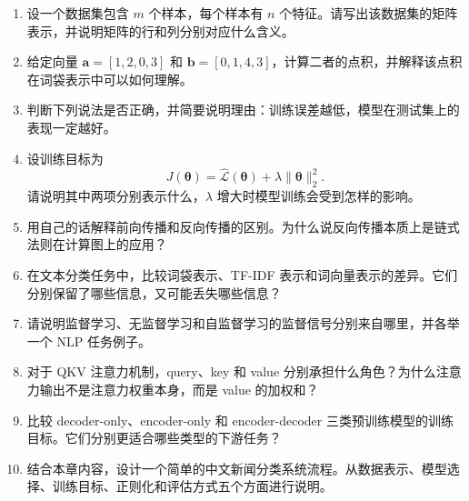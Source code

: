 \begin{exercisebox}
  \begin{enumerate}
    \item 设一个数据集包含 $m$ 个样本，每个样本有 $n$ 个特征。请写出该数据集的矩阵表示，并说明矩阵的行和列分别对应什么含义。

    \item 给定向量 $\mathbf{a}=[1,2,0,3]$ 和 $\mathbf{b}=[0,1,4,3]$，计算二者的点积，并解释该点积在词袋表示中可以如何理解。

    \item 判断下列说法是否正确，并简要说明理由：训练误差越低，模型在测试集上的表现一定越好。

    \item 设训练目标为
    \[
      J(\boldsymbol{\theta})=\hat{\mathcal{L}}(\boldsymbol{\theta})+\lambda\|\boldsymbol{\theta}\|_2^2.
    \]
    请说明其中两项分别表示什么，$\lambda$ 增大时模型训练会受到怎样的影响。

    \item 用自己的话解释前向传播和反向传播的区别。为什么说反向传播本质上是链式法则在计算图上的应用？

    \item 在文本分类任务中，比较词袋表示、TF-IDF 表示和词向量表示的差异。它们分别保留了哪些信息，又可能丢失哪些信息？

    \item 请说明监督学习、无监督学习和自监督学习的监督信号分别来自哪里，并各举一个 NLP 任务例子。

    \item 对于 QKV 注意力机制，query、key 和 value 分别承担什么角色？为什么注意力输出不是注意力权重本身，而是 value 的加权和？

    \item 比较 decoder-only、encoder-only 和 encoder-decoder 三类预训练模型的训练目标。它们分别更适合哪些类型的下游任务？

    \item 结合本章内容，设计一个简单的中文新闻分类系统流程。从数据表示、模型选择、训练目标、正则化和评估方式五个方面进行说明。
  \end{enumerate}
\end{exercisebox}
